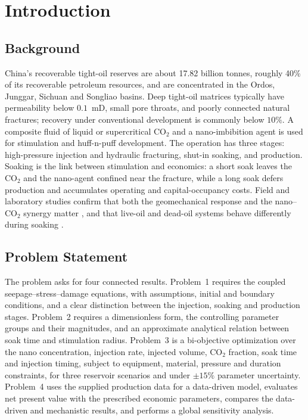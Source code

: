 \section{Introduction}

\subsection{Background}

China's recoverable tight-oil reserves are about 17.82 billion tonnes, roughly
40\% of its recoverable petroleum resources, and are concentrated in the Ordos,
Junggar, Sichuan and Songliao basins. Deep tight-oil matrices typically have
permeability below $0.1$~mD, small pore throats, and poorly connected natural
fractures; recovery under conventional development is commonly below $10\%$.
A composite fluid of liquid or supercritical CO$_2$ and a nano-imbibition agent
is used for stimulation and huff-n-puff development. The operation has three
stages: high-pressure injection and hydraulic fracturing, shut-in soaking, and
production. Soaking is the link between stimulation and economics: a short soak
leaves the CO$_2$ and the nano-agent confined near the fracture, while a long
soak defers production and accumulates operating and capital-occupancy costs.
Field and laboratory studies confirm that both the geomechanical response and
the nano--CO$_2$ synergy matter \cite{p1-03,p1-15}, and that live-oil and
dead-oil systems behave differently during soaking \cite{p2-02}.

\subsection{Problem Statement}

The problem asks for four connected results. Problem~1 requires the coupled
seepage--stress--damage equations, with assumptions, initial and boundary
conditions, and a clear distinction between the injection, soaking and
production stages. Problem~2 requires a dimensionless form, the controlling
parameter groups and their magnitudes, and an approximate analytical relation
between soak time and stimulation radius. Problem~3 is a bi-objective
optimization over the nano concentration, injection rate, injected volume,
CO$_2$ fraction, soak time and injection timing, subject to equipment, material,
pressure and duration constraints, for three reservoir scenarios and under
$\pm15\%$ parameter uncertainty. Problem~4 uses the supplied production data
for a data-driven model, evaluates net present value with the prescribed
economic parameters, compares the data-driven and mechanistic results, and
performs a global sensitivity analysis.

